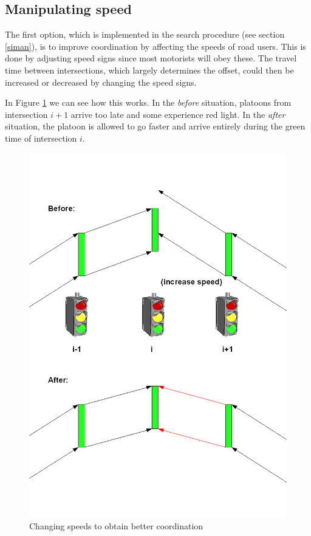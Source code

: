 \subsection{Manipulating speed}
The first option, which is implemented in the search procedure (see section \ref{siman}), is to improve coordination by affecting the speeds of road users. This is done by adjusting speed signs since most motorists will obey these. The travel time between intersections, which largely determines the offset, could then be increased or decreased by changing the speed signs. 

In Figure \ref{fig:change_speed} we can see how this works. In the \textit{before} situation, platoons from intersection $i+1$ arrive too late and some experience red light. In the \textit{after} situation, the platoon is allowed to go faster and arrive entirely during the green time of intersection $i$.

\begin{figure}[ht]
\centering
\includegraphics[scale=0.2]{change_speed.png}
\caption{Changing speeds to obtain better coordination}
\label{fig:change_speed}
\end{figure}

